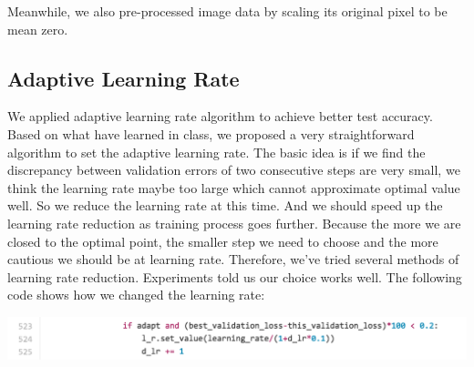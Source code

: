\documentclass[final,leqno]{siamltex}
\begin{document}
Meanwhile, we also pre-processed image data by scaling its original pixel to be mean zero.

\subsection{Adaptive Learning Rate}
We applied adaptive learning rate algorithm to achieve better test accuracy. Based on what have learned in class, we proposed a very straightforward algorithm to set the adaptive learning rate. The basic idea is if we find the discrepancy between validation errors of two consecutive steps are very small, we think the learning rate maybe too large which cannot approximate optimal value well. So we reduce the learning rate at this time. And we should speed up the learning rate reduction as training process goes further. Because the more we are closed to the optimal point, the smaller step we need to choose and the more cautious we should be at learning rate. Therefore, we’ve tried several methods of learning rate reduction. Experiments told us our choice works well. The following code shows how we changed the learning rate:\\

\begin{center}
\includegraphics[scale=0.55]{Figures/learning_rate}
\end{center}
\end{document}
